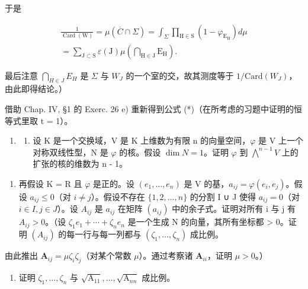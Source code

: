 于是

\[
\begin{array}{l} \frac {1}{\operatorname{Card} (\mathrm{W})} = \mu (\overline {{C}} \cap \Sigma) = \int_ {\Sigma} \prod_ {\mathrm{H} \in \mathrm{S}} (1 - \varphi_ {\mathrm{E} _ {\mathrm{H}}}) d \mu \\ = \sum_ {\mathrm{J} \subset \mathrm{S}} \varepsilon (\mathrm{J}) \mu \left(\bigcap_ {\mathrm{H} \in \mathrm{J}} \mathrm{E} _ {\mathrm{H}}\right). \end{array}
\]

最后注意 \(\bigcap_{H\in J}E_H\) 是 \(\Sigma\) 与 \(W_J\) 的一个室的交，故其测度等于 \(1 / \mathrm{Card}(W_J)\)，由此即得结论。）

借助 Chap. IV, §1 的 Exerc. 26 e) 重新得到公式 (*)（在所考虑的习题中证明的恒等式里取 t = 1）。

\begin{enumerate}
\def\labelenumi{\arabic{enumi})}
\setcounter{enumi}{5}
\tightlist
\item
  \begin{enumerate}
  \def\labelenumii{\alph{enumii})}
  \tightlist
  \item
    设 K 是一个交换域，V 是 K 上维数为有限 n 的向量空间，\(\varphi\) 是 V 上一个对称双线性型，N 是 \(\varphi\) 的核。假设 \(\dim N = 1\)。证明 \(\varphi\) 到 \(\bigwedge^{n-1} V\) 上的扩张的核的维数为 n - 1。
  \end{enumerate}
\end{enumerate}

\begin{enumerate}
\def\labelenumi{\alph{enumi})}
\setcounter{enumi}{1}
\tightlist
\item
  再假设 K = R 且 \(\varphi\) 是正的。设 \((e_{1},\ldots,e_{n})\) 是 V 的基，\(a_{ij} = \varphi(e_{i},e_{j})\)。假设 \(a_{ij} \leqslant 0\)（对 \(i \neq j\)）。假设不存在 \(\{1,2,\ldots,n\}\) 的分割 I ∪ J 使得 \(a_{ij} = 0\)（对 \(i \in I, j \in J\)）。设 \(A_{ij}\) 是 \(a_{ij}\) 在矩阵 \((a_{ij})\) 中的余子式。证明对所有 i 与 j 有 \(A_{ij} > 0\)。（设 \(\zeta_{1}e_{1} + \cdots + \zeta_{n}e_{n}\) 是一个生成 N 的向量，其所有坐标都 \textgreater{} 0。证明 \((A_{ij})\) 的每一行与每一列都与 \((\zeta_{1},\ldots,\zeta_{n})\) 成比例。
\end{enumerate}

由此推出 \(\mathbf{A}_{ij} = \mu \zeta_i\zeta_j\)（对某个常数 \(\mu\)）。通过考察诸 \(\mathbf{A}_{ii}\)，证明 \(\mu > 0\)。）

\begin{enumerate}
\def\labelenumi{\alph{enumi})}
\setcounter{enumi}{2}
\tightlist
\item
  证明 \(\zeta_1, \ldots, \zeta_n\) 与 \(\sqrt{\mathrm{A}_{11}}, \ldots, \sqrt{\mathrm{A}_{nn}}\) 成比例。
\end{enumerate}

